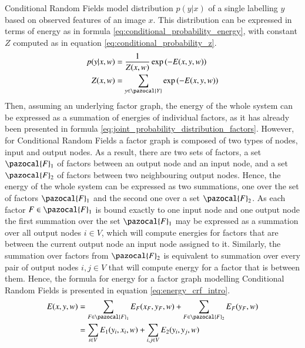Conditional Random Fields model distribution $p(y|x)$ of a single labelling $y$ based on observed features of an image $x$. This distribution can be expressed in terms of energy as in formula \ref{eq:conditional_probability_energy}, with constant $Z$ computed as in equation \ref{eq:conditional_probability_z}.
\begin{align}
    \label{eq:conditional_probability_energy}
    p(y|x,w) &= \frac{1}{Z(x,w)} \exp{(-E(x,y,w))} \\
    Z(x,w) &= \sum_{y \in \pazocal{Y}}{\exp{(-E(x,y,w))}}
    \label{eq:conditional_probability_z}
\end{align}
Then, assuming an underlying factor graph, the energy of the whole system can be expressed as a summation of energies of individual factors, as it has already been presented in formula \ref{eq:joint_probability_distribution_factors}. However, for Conditional Random Fields a factor graph is composed of two types of nodes, input and output nodes. As a result, there are two sets of factors, a set $\pazocal{F}_1$ of factors between an output node and an input node, and a set $\pazocal{F}_2$ of factors between two neighbouring output nodes. Hence, the energy of the whole system can be expressed as two summations, one over the set of factors $\pazocal{F}_1$ and the second one over a set $\pazocal{F}_2$. As each factor $F \in \pazocal{F}_1$ is bound exactly to one input node and one output node the first summation over the set $\pazocal{F}_1$ may be expressed as a summation over all output nodes $i \in V$, which will compute energies for factors that are between the current output node an input node assigned to it. Similarly, the summation over factors from $\pazocal{F}_2$ is equivalent to summation over every pair of output nodes $i,j \in V$ that will compute energy for a factor that is between them. Hence, the formula for energy for a factor graph modelling Conditional Random Fields is presented in equation \ref{eq:energy_crf_intro}.
\begin{equation}
    \label{eq:energy_crf_intro}
    \begin{aligned}
        E(x,y,w) &= \sum_{F \in \pazocal{F}_1}E_F(x_F,y_F,w) + \sum_{F \in \pazocal{F}_2}E_F(y_F,w) \\
        &=\sum_{i\in V}{E_1}({y_i},{x_i},w) + \sum_{i,j \in V}{E_2}({y_i},{y_j},w)
    \end{aligned}
\end{equation}

